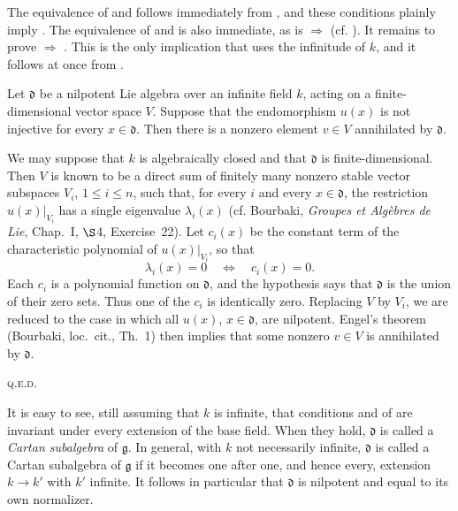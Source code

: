 The equivalence of  and  follows immediately from , and
these conditions plainly imply . The equivalence of  and
 is also immediate, as is  \(\Rightarrow\) 
(cf. ). It remains to prove  \(\Rightarrow\) . This
is the only implication that uses the infinitude of \(k\), and it
follows at once from .

\begin{lemma}
Let \(\mathfrak d\) be a nilpotent Lie algebra over an infinite field
\(k\), acting on a finite-dimensional vector space \(V\). Suppose
that the endomorphism \(u(x)\) is not injective for every
\(x\in\mathfrak d\). Then there is a nonzero element \(v\in V\)
annihilated by \(\mathfrak d\).
\end{lemma}

We may suppose that \(k\) is algebraically closed and that
\(\mathfrak d\) is finite-dimensional. Then \(V\) is known to be a
direct sum of finitely many nonzero stable vector subspaces \(V_i\),
\(1\leq i\leq n\), such that, for every \(i\) and every
\(x\in\mathfrak d\), the restriction \(u(x)|_{V_i}\) has a single
eigenvalue \(\lambda_i(x)\) (cf. Bourbaki, \emph{Groupes et Algèbres
de Lie}, Chap.~I, \(\S\)4, Exercise~22). Let \(c_i(x)\) be the
constant term of the characteristic polynomial of
\(u(x)|_{V_i}\), so that
\[
  \lambda_i(x)=0\quad\Longleftrightarrow\quad c_i(x)=0.
\]
Each \(c_i\) is a polynomial function on \(\mathfrak d\), and the
hypothesis says that \(\mathfrak d\) is the union of their zero sets.
Thus one of the \(c_i\) is identically zero. Replacing \(V\) by
\(V_i\), we are reduced to the case in which all \(u(x)\),
\(x\in\mathfrak d\), are nilpotent. Engel's theorem (Bourbaki,
loc.\ cit., Th.~1) then implies that some nonzero \(v\in V\) is
annihilated by \(\mathfrak d\).
\par\hfill\textsc{q.e.d.}

It is easy to see, still assuming that \(k\) is infinite, that
conditions  and  of  are invariant under every extension
of the base field. When they hold, \(\mathfrak d\) is called a
\emph{Cartan subalgebra} of \(\mathfrak g\). In general, with \(k\)
not necessarily infinite, \(\mathfrak d\) is called a Cartan
subalgebra of \(\mathfrak g\) if it becomes one after one, and hence
every, extension \(k\to k'\) with \(k'\) infinite. It follows in
particular that \(\mathfrak d\) is nilpotent and equal to its own
normalizer.


